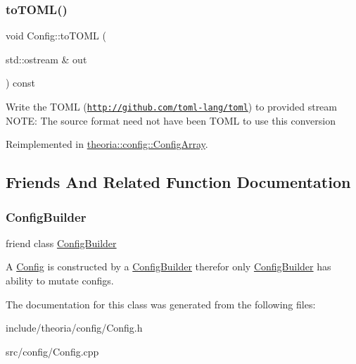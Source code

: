 \subsubsection{\texorpdfstring{to\+T\+O\+M\+L()}{toTOML()}}
{\footnotesize\ttfamily void Config\+::to\+T\+O\+ML (\begin{DoxyParamCaption}\item[{std\+::ostream \&}]{out }\end{DoxyParamCaption}) const\hspace{0.3cm}{\ttfamily [virtual]}}

Write the T\+O\+ML (\href{http://github.com/toml-lang/toml}{\tt http\+://github.\+com/toml-\/lang/toml}) to provided stream N\+O\+TE\+: The source format need not have been T\+O\+ML to use this conversion 

Reimplemented in \hyperlink{classtheoria_1_1config_1_1ConfigArray_a1c73dba526ebd747682bc961676f5158}{theoria\+::config\+::\+Config\+Array}.



\subsection{Friends And Related Function Documentation}
\mbox{\label{classtheoria_1_1config_1_1Config_a3d61732fded713b38fc7f9fe3d80e2ae}} 
\subsubsection{\texorpdfstring{Config\+Builder}{ConfigBuilder}}
{\footnotesize\ttfamily friend class \hyperlink{classtheoria_1_1config_1_1ConfigBuilder}{Config\+Builder}\hspace{0.3cm}{\ttfamily [friend]}}

A \hyperlink{classtheoria_1_1config_1_1Config}{Config} is constructed by a \hyperlink{classtheoria_1_1config_1_1ConfigBuilder}{Config\+Builder} therefor only \hyperlink{classtheoria_1_1config_1_1ConfigBuilder}{Config\+Builder} has ability to mutate configs. 

The documentation for this class was generated from the following files\+:\begin{DoxyCompactItemize}
\item 
include/theoria/config/Config.\+h\item 
src/config/Config.\+cpp\end{DoxyCompactItemize}
